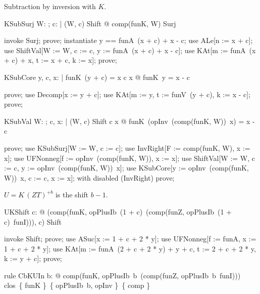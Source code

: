 \documentclass{article}
\begin{document}
Subtraction by inversion with $K$.

\begin{theorem}{KSubSurj}
  \forall W: \nat \fun \nat; c: \nat | (W, c) \in Shift @ comp(funK, W) \in Surj
\end{theorem}

\begin{zproof}
invoke Surj;
prove;
instantiate y == funA~(x + c) + x - c;
use ALe[n := x + c];
use ShiftVal[W := W, c := c, y := funA~(x + c) + x - c];
use KAt[m := funA~(x + c) + x, t := x + c, k := x];
prove;
\end{zproof}

\begin{theorem}{KSubCore}
  \forall y, c, x: \nat | funK~(y + c) = x \land c \leq x @ funK~y = x - c
\end{theorem}

\begin{zproof}
prove;
use Decomp[x := y + c];
use KAt[m := y, t := funV~(y + c), k := x - c];
prove;
\end{zproof}

\begin{theorem}{KSubVal}
  \forall W: \nat \fun \nat; c, x: \nat | (W, c) \in Shift \land c \leq x @ funK~(opInv~(comp(funK, W))~x) = x - c
\end{theorem}

\begin{zproof}
prove;
use KSubSurj[W := W, c := c];
use InvRight[F := comp(funK, W), x := x];
use UFNonneg[f := opInv~(comp(funK, W)), x := x];
use ShiftVal[W := W, c := c, y := opInv~(comp(funK, W))~x];
use KSubCore[y := opInv~(comp(funK, W))~x, c := c, x := x];
with disabled (InvRight) prove;
\end{zproof}

$U = K\,(Z T)^{+b}$ is the shift $b - 1$.

\begin{theorem}{UKShift}
  \forall c: \nat @ (comp(funK, opPlusIb~(1 + c)~(comp(funZ, opPlusIb~(1 + c)~funI))), c) \in Shift
\end{theorem}

\begin{zproof}
invoke Shift;
prove;
use ASuc[x := 1 + c + 2 * y];
use UFNonneg[f := funA, x := 1 + c + 2 * y];
use KAt[m := funA~(2 + c + 2 * y) + y + c, t := 2 + c + 2 * y, k := y + c];
prove;
\end{zproof}

\begin{theorem}{rule CbKUIn}
  \forall b: \nat @ comp(funK, opPlusIb~b~(comp(funZ, opPlusIb~b~funI))) \in clos~\{ funK \}~\{ opPlusIb~b, opInv \}~\{ comp \}
\end{theorem}
\end{document}
